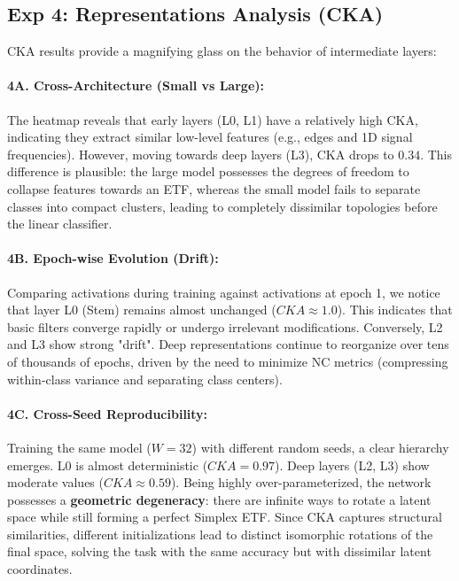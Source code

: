 \documentclass[10pt,twocolumn,letterpaper]{article}
\begin{document}
\subsection{Exp 4: Representations Analysis (CKA)}
CKA results provide a magnifying glass on the behavior of intermediate layers:

\paragraph{4A. Cross-Architecture (Small vs Large):} 
The heatmap reveals that early layers (L0, L1) have a relatively high CKA, indicating they extract similar low-level features (e.g., edges and 1D signal frequencies). However, moving towards deep layers (L3), CKA drops to $0.34$. This difference is plausible: the large model possesses the degrees of freedom to collapse features towards an ETF, whereas the small model fails to separate classes into compact clusters, leading to completely dissimilar topologies before the linear classifier.

\paragraph{4B. Epoch-wise Evolution (Drift):}
Comparing activations during training against activations at epoch 1, we notice that layer L0 (Stem) remains almost unchanged ($CKA \approx 1.0$). This indicates that basic filters converge rapidly or undergo irrelevant modifications. Conversely, L2 and L3 show strong "drift". Deep representations continue to reorganize over tens of thousands of epochs, driven by the need to minimize NC metrics (compressing within-class variance and separating class centers).

\paragraph{4C. Cross-Seed Reproducibility:}
Training the same model ($W=32$) with different random seeds, a clear hierarchy emerges. L0 is almost deterministic ($CKA = 0.97$). Deep layers (L2, L3) show moderate values ($CKA \approx 0.59$). Being highly over-parameterized, the network possesses a \textbf{geometric degeneracy}: there are infinite ways to rotate a latent space while still forming a perfect Simplex ETF. Since CKA captures structural similarities, different initializations lead to distinct isomorphic rotations of the final space, solving the task with the same accuracy but with dissimilar latent coordinates.
\end{document}
